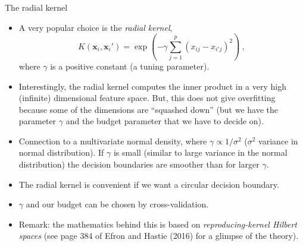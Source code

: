 \documentclass[10pt,ignorenonframetext,]{beamer}
\providecommand{\tightlist}{%
  \setlength{\itemsep}{0pt}\setlength{\parskip}{0pt}}
\begin{document}
\begin{frame}

\begin{block}{The radial kernel}

\begin{itemize}
\tightlist
\item
  A very popular choice is the \emph{radial kernel}, \[
  K({\boldsymbol x}_i,{\boldsymbol x}_i')=\exp(-\gamma \sum_{j=1}^p (x_{ij}-x_{i'j})^2) \ ,
  \] where \(\gamma\) is a positive constant (a tuning parameter).
\end{itemize}

\vspace{1mm}

\begin{itemize}
\tightlist
\item
  Interestingly, the radial kernel computes the inner product in a very
  high (infinite) dimensional feature space. But, this does not give
  overfitting because some of the dimensions are ``squashed down'' (but
  we have the parameter \(\gamma\) and the budget parameter that we have
  to decide on).
\end{itemize}

\vspace{1mm} \small

\begin{itemize}
\tightlist
\item
  Connection to a multivariate normal density, where
  \(\gamma \propto 1/\sigma^2\) (\(\sigma^2\) variance in normal
  distribution). If \(\gamma\) is small (similar to large variance in
  the normal distribution) the decision boundaries are smoother than for
  larger \(\gamma\).
\end{itemize}

\end{block}

\end{frame}

\begin{frame}

\begin{itemize}
\item
  The radial kernel is convenient if we want a circular decision
  boundary.
\item
  \(\gamma\) and our budget can be chosen by cross-validation.
\item
  Remark: the mathematics behind this is based on
  \emph{reproducing-kernel Hilbert spaces} (see page 384 of Efron and
  Hastie (2016) for a glimpse of the theory).
\end{itemize}

\end{frame}
\end{document}
